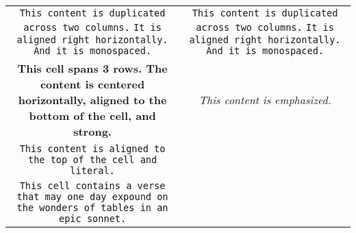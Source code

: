 \begin{center}
\begin{tabular}{|c|c|}
\hline
\texttt{This content is duplicated across two columns.}
\texttt{It is aligned right horizontally.}
\texttt{And it is monospaced.} & \texttt{This content is duplicated across two columns.}
\texttt{It is aligned right horizontally.}
\texttt{And it is monospaced.} \\
\textbf{This cell spans 3 rows. The content is centered horizontally, aligned to the bottom of the cell, and strong.} & \emph{This content is emphasized.} \\
\texttt{This content is aligned to the top of the cell and literal.} \\
\texttt{This cell contains a verse
that may one day expound on the
wonders of tables in an
epic sonnet.} \\
\hline
\end{tabular}
\end{center}
